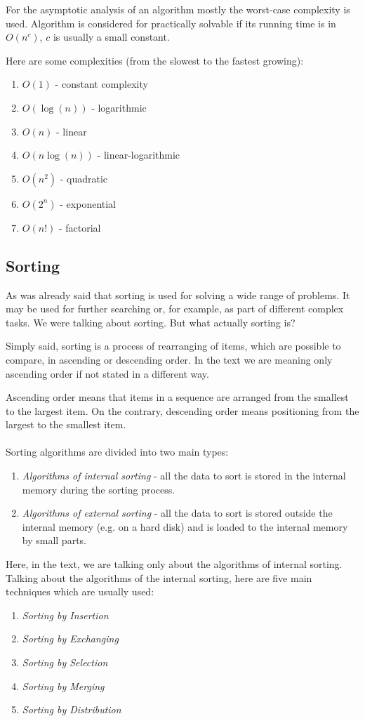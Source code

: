 \documentclass[
  field=inf,
  biblatex,
  language=english,
  glossaries,
  index
]{kidiplom}
\begin{document}
For the asymptotic analysis of an algorithm mostly the worst-case complexity is used. Algorithm is considered for practically solvable if its running time is in $O(n^c)$, $c$ is usually a small constant. 

Here are some complexities (from the slowest to the fastest growing):
\begin{enumerate}
 \item $O(1)$ - constant complexity
 \item $O(\log(n))$ - logarithmic
 \item $O(n)$ - linear
 \item $O(n \log(n))$ - linear-logarithmic
 \item $O(n^2)$ - quadratic
 \item $O(2^n)$ - exponential
 \item $O(n!)$ - factorial
\end{enumerate}

\subsection{Sorting}

As was already said that sorting is used for solving a wide range of problems. It may be used for further searching or, for example, as part of different complex tasks. We were talking about sorting. But what actually sorting is?

Simply said, sorting is a process of rearranging of items, which are possible to compare, in ascending or descending order. In the text we are meaning only ascending order if not stated in a different way.

Ascending order means that items in a sequence are arranged from the smallest to the largest item. On the contrary, descending order means positioning from the largest to the smallest item.
\\\\
Sorting algorithms are divided into two main types:
\begin{enumerate}
	\item \textit{Algorithms of internal sorting} - all the data to sort is stored in the internal memory during the sorting process. 
	\item \textit{Algorithms of external sorting} - all the data to sort is stored outside the internal memory (e.g. on a hard disk) and is loaded to the internal memory by small parts.
\end{enumerate}

Here, in the text, we are talking only about the algorithms of internal sorting. Talking about the algorithms of the internal sorting, here are five main techniques which are usually used\cite{knuth3}:
\begin{enumerate}
	\item \textit{Sorting by Insertion}
	\item \textit{Sorting by Exchanging}
	\item \textit{Sorting by Selection}
	\item \textit{Sorting by Merging}
	\item \textit{Sorting by Distribution}
\end{enumerate}
\end{document}
